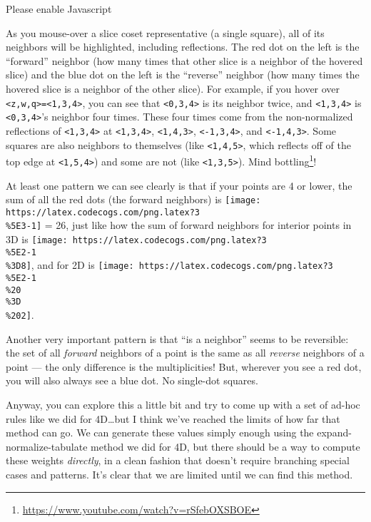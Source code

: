 \documentclass[]{article}
\renewcommand{\href}[2]{#2\footnote{\url{#1}}}
\begin{document}
\leavevmode\hypertarget{golSyms5D}{}%
Please enable Javascript

As you mouse-over a slice coset representative (a single square), all of its
neighbors will be highlighted, including reflections. The red dot on the left is
the ``forward'' neighbor (how many times that other slice is a neighbor of the
hovered slice) and the blue dot on the left is the ``reverse'' neighbor (how
many times the hovered slice is a neighbor of the other slice). For example, if
you hover over
\texttt{\textless{}z,w,q\textgreater{}=\textless{}1,3,4\textgreater{}}, you can
see that \texttt{\textless{}0,3,4\textgreater{}} is its neighbor twice, and
\texttt{\textless{}1,3,4\textgreater{}} is
\texttt{\textless{}0,3,4\textgreater{}}'s neighbor four times. These four times
come from the non-normalized reflections of
\texttt{\textless{}1,3,4\textgreater{}} at
\texttt{\textless{}1,3,4\textgreater{}},
\texttt{\textless{}1,4,3\textgreater{}},
\texttt{\textless{}-1,3,4\textgreater{}}, and
\texttt{\textless{}-1,4,3\textgreater{}}. Some squares are also neighbors to
themselves (like \texttt{\textless{}1,4,5\textgreater{}}, which reflects off of
the top edge at \texttt{\textless{}1,5,4\textgreater{}}) and some are not (like
\texttt{\textless{}1,3,5\textgreater{}}).
\href{https://www.youtube.com/watch?v=rSfebOXSBOE}{Mind bottling}!

At least one pattern we can see clearly is that if your points are 4 or lower,
the sum of all the red dots (the forward neighbors) is
\texttt{[image: https://latex.codecogs.com/png.latex?3\\\%5E3-1]} = 26, just like
how the sum of forward neighbors for interior points in 3D is
\texttt{[image: https://latex.codecogs.com/png.latex?3\\\%5E2-1\\\%3D8]}, and for 2D
is \texttt{[image: https://latex.codecogs.com/png.latex?3\\\%5E2-1\\\%20\\\%3D\\\%202]}.

Another very important pattern is that ``is a neighbor'' seems to be reversible:
the set of all \emph{forward} neighbors of a point is the same as all
\emph{reverse} neighbors of a point --- the only difference is the
multiplicities! But, wherever you see a red dot, you will also always see a blue
dot. No single-dot squares.

Anyway, you can explore this a little bit and try to come up with a set of
ad-hoc rules like we did for 4D\ldots but I think we've reached the limits of
how far that method can go. We can generate these values simply enough using the
expand-normalize-tabulate method we did for 4D, but there should be a way to
compute these weights \emph{directly}, in a clean fashion that doesn't require
branching special cases and patterns. It's clear that we are limited until we
can find this method.
\end{document}
